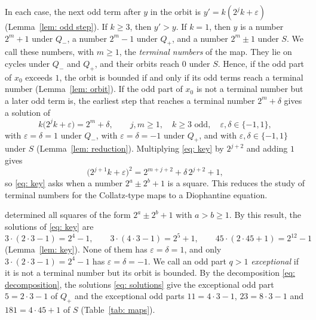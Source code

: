 \documentclass{article}
\newcommand{\Ge}{\geqslant}
\begin{document}
In each case, the next odd term after $y$ in the orbit is $y' = k (2^j k + \varepsilon)$ (Lemma~\ref{lem: odd step}). If $k \Ge 3$, then $y' > y$. If $k = 1$, then $y$ is a number $2^m + 1$ under $Q_-$, a number $2^m - 1$ under $Q_+$, and a number $2^m \pm 1$ under $S$. We call these numbers, with $m \Ge 1$, the \emph{terminal numbers} of the map. They lie on cycles under $Q_-$ and $Q_+$, and their orbits reach $0$ under $S$. Hence, if the odd part of $x_0$ exceeds $1$, the orbit is bounded if and only if its odd terms reach a terminal number (Lemma~\ref{lem: orbit}). If the odd part of $x_0$ is not a terminal number but a later odd term is, the earliest step that reaches a terminal number $2^m + \delta$ gives a solution of
\begin{equation}
	\boxed{
    k \bigl( 2^j k + \varepsilon \bigr) = 2^m + \delta , \qquad j, m \Ge 1 , \quad k \Ge 3 \text{ odd} , \quad \varepsilon, \delta \in \{-1, 1\} ,}
    \label{eq: key}
\end{equation}
with $\varepsilon = \delta = 1$ under $Q_-$, with $\varepsilon = \delta = -1$ under $Q_+$, and with $\varepsilon, \delta \in \{-1, 1\}$ under $S$ (Lemma~\ref{lem: reduction}). Multiplying \eqref{eq: key} by $2^{j+2}$ and adding $1$ gives
\begin{equation}
    \bigl( 2^{j+1} k + \varepsilon \bigr)^2 = 2^{m+j+2} + \delta \, 2^{j+2} + 1 ,
    \label{eq: square}
\end{equation}
so \eqref{eq: key} asks when a number $2^a \pm 2^b + 1$ is a square. This reduces the study of terminal numbers for the Collatz-type maps to a Diophantine equation.

\citet{szalay2002equations} determined all squares of the form $2^a \pm 2^b + 1$ with $a > b \Ge 1$. By this result, the solutions of \eqref{eq: key} are
\begin{equation}
    3 \cdot (2 \cdot 3 - 1) = 2^4 - 1 , \qquad 3 \cdot (4 \cdot 3 - 1) = 2^5 + 1 , \qquad 45 \cdot (2 \cdot 45 + 1) = 2^{12} - 1
    \label{eq: solutions}
\end{equation}
(Lemma~\ref{lem: key}). None of them has $\varepsilon = \delta = 1$, and only $3 \cdot (2 \cdot 3 - 1) = 2^4 - 1$ has $\varepsilon = \delta = -1$. We call an odd part $q > 1$ \emph{exceptional} if it is not a terminal number but its orbit is bounded. By the decomposition \eqref{eq: decomposition}, the solutions \eqref{eq: solutions} give the exceptional odd part $5 = 2 \cdot 3 - 1$ of $Q_+$ and the exceptional odd parts $11 = 4 \cdot 3 - 1$, $23 = 8 \cdot 3 - 1$ and $181 = 4 \cdot 45 + 1$ of $S$ (Table~\ref{tab: maps}).
\end{document}
